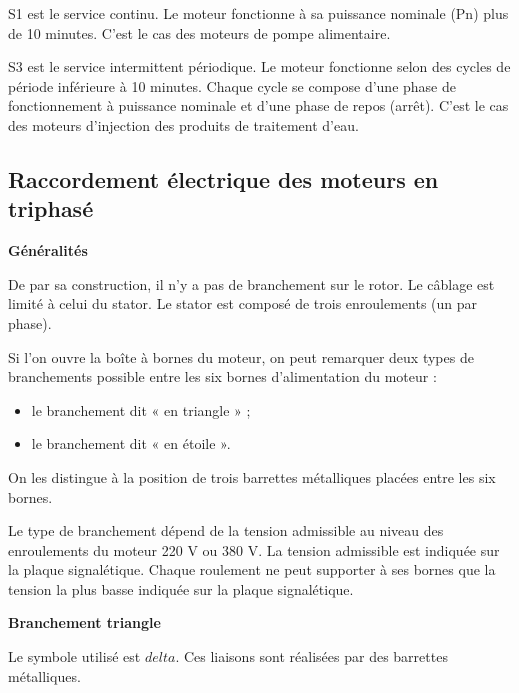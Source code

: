 S1 est le service continu. Le moteur fonctionne à sa puissance nominale (Pn) plus de 10 minutes. C’est le cas des moteurs de pompe alimentaire.
\vspace{0.3cm}

S3 est le service intermittent périodique. Le moteur fonctionne selon des cycles de période inférieure à 10 minutes. Chaque cycle se compose d’une phase de fonctionnement à puissance nominale et d’une phase de repos (arrêt). C’est le cas des moteurs d’injection des produits de traitement d’eau.




\subsection{Raccordement électrique des moteurs en triphasé}

\textbf{Généralités}
\vspace{0.3cm}



De par sa construction, il n’y a pas de branchement sur le rotor. Le câblage est limité à celui du stator. Le stator est composé de trois enroulements (un par phase).
\vspace{0.3cm}

Si l’on ouvre la boîte à bornes du moteur, on peut remarquer deux types de branchements possible entre les six bornes d’alimentation du moteur :
\begin{itemize}
\item le branchement dit « en triangle » ;
\item le branchement dit « en étoile ».
\end{itemize}

On les distingue à la position de trois barrettes métalliques placées entre les six bornes.
\vspace{0.3cm}

Le type de branchement dépend de la tension admissible au niveau des enroulements du moteur 220 V ou 380 V. La tension admissible est indiquée sur la plaque signalétique. Chaque roulement ne peut supporter à ses bornes que la tension la plus basse indiquée sur la plaque signalétique.

\vspace{0.3cm}
\textbf{Branchement triangle}
\vspace{0.3cm}

Le symbole utilisé est $ delta $.
Ces liaisons sont réalisées par des barrettes métalliques.

\vspace{0.3cm}


